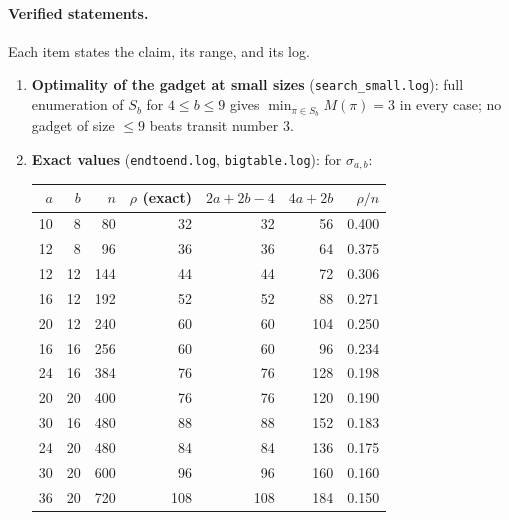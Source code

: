 \documentclass[11pt]{article}
\theoremstyle{definition}
\begin{document}
\paragraph{Verified statements.} Each item states the claim, its range, and its log.
\begin{enumerate}
\item \textbf{Optimality of the gadget at small sizes} (\texttt{search\_small.log}):
full enumeration of $S_b$ for $4 \le b \le 9$ gives $\min_{\pi \in S_b} M(\pi) = 3$ in
every case; no gadget of size $\le 9$ beats transit number $3$.
\item \textbf{Exact values} (\texttt{endtoend.log}, \texttt{bigtable.log}): for
$\sigma_{a,b}$:

\begin{center}
\begin{tabular}{rrrrrrr}
\toprule
$a$ & $b$ & $n$ & $\rho$ (exact) & $2a{+}2b{-}4$ & $4a{+}2b$ & $\rho/n$ \\
\midrule
10 & 8  & 80  & 32 & 32 & 56  & 0.400 \\
12 & 8  & 96  & 36 & 36 & 64  & 0.375 \\
12 & 12 & 144 & 44 & 44 & 72  & 0.306 \\
16 & 12 & 192 & 52 & 52 & 88  & 0.271 \\
20 & 12 & 240 & 60 & 60 & 104 & 0.250 \\
16 & 16 & 256 & 60 & 60 & 96  & 0.234 \\
24 & 16 & 384 & 76 & 76 & 128 & 0.198 \\
20 & 20 & 400 & 76 & 76 & 120 & 0.190 \\
30 & 16 & 480 & 88 & 88 & 152 & 0.183 \\
24 & 20 & 480 & 84 & 84 & 136 & 0.175 \\
30 & 20 & 600 & 96 & 96 & 160 & 0.160 \\
36 & 20 & 720 & 108 & 108 & 184 & 0.150 \\
\bottomrule
\end{tabular}
\end{center}


\end{enumerate}
\end{document}
